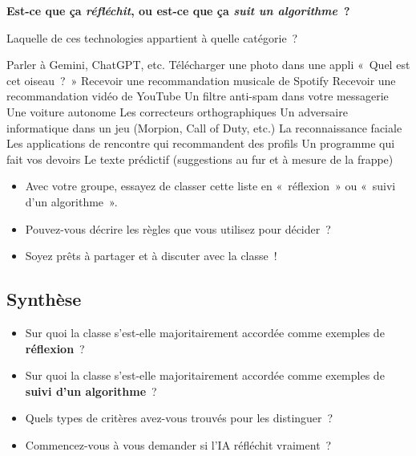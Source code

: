 \documentclass[12pt,a4paper]{article}
\begin{document}
\begin{thinkbox}
  \textbf{Est-ce que ça \emph{réfléchit}, ou est-ce que ça \emph{suit un algorithme}~?}

  Laquelle de ces technologies appartient à quelle catégorie~?
\end{thinkbox}

\begin{tcbitemize}[
    raster columns=3,
    raster equal height=rows,
    colback=white,
    colframe=bsgray!40,
    fonttitle=\bfseries,
    halign=center,
    valign=center,
    sharp corners,
    boxrule=0.6pt,
    left=0.4em, right=0.4em, top=0.55em, bottom=0.55em,
  ]
  \tcbitem Parler à Gemini, ChatGPT, etc.
  \tcbitem Télécharger une photo dans une appli «~Quel est cet oiseau~?~»
  \tcbitem Recevoir une recommandation musicale de Spotify
  \tcbitem Recevoir une recommandation vidéo de YouTube
  \tcbitem Un filtre anti-spam dans votre messagerie
  \tcbitem Une voiture autonome
  \tcbitem Les correcteurs orthographiques
  \tcbitem Un adversaire informatique dans un jeu (Morpion, Call of Duty, etc.)
  \tcbitem La reconnaissance faciale
  \tcbitem Les applications de rencontre qui recommandent des profils
  \tcbitem Un programme qui fait vos devoirs
  \tcbitem Le texte prédictif (suggestions au fur et à mesure de la frappe)
\end{tcbitemize}

\begin{activitybox}
  \begin{itemize}
    \item Avec votre groupe, essayez de classer cette liste en «~réflexion~» ou «~suivi d'un algorithme~».
    \item Pouvez-vous décrire les règles que vous utilisez pour décider~?
    \item Soyez prêts à partager et à discuter avec la classe~!
  \end{itemize}
\end{activitybox}

\subsection{Synthèse}

\begin{itemize}
  \item Sur quoi la classe s'est-elle majoritairement accordée comme exemples de \textbf{réflexion}~?
  \item Sur quoi la classe s'est-elle majoritairement accordée comme exemples de \textbf{suivi d'un algorithme}~?
  \item Quels types de critères avez-vous trouvés pour les distinguer~?
  \item Commencez-vous à vous demander si l'IA réfléchit vraiment~?
\end{itemize}
\end{document}
